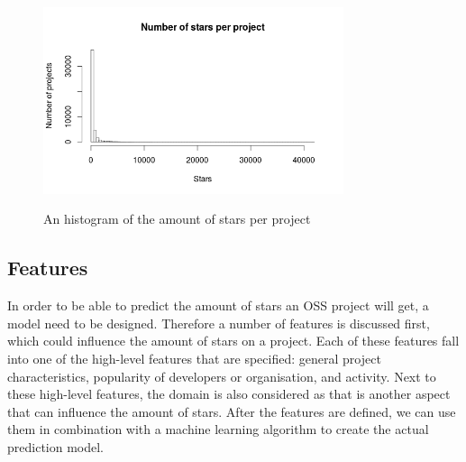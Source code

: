         \begin{figure}
            \includegraphics[width=250pt]{figures/star-distribution}
            \label{fig:star-distribution-plot}
            \caption{An histogram of the amount of stars per project}
        \end{figure}
    
    \subsection{Features}
    In order to be able to predict the amount of stars an OSS project will get, a model need to be designed.
    Therefore a number of features is discussed first, which could influence the amount of stars on a project.
    Each of these features fall into one of the high-level features that are specified: general project characteristics, popularity of developers or organisation, and activity.
    Next to these high-level features, the domain is also considered as that is another aspect that can influence the amount of stars.
    After the features are defined, we can use them in combination with a machine learning algorithm to create the actual prediction model.\\

